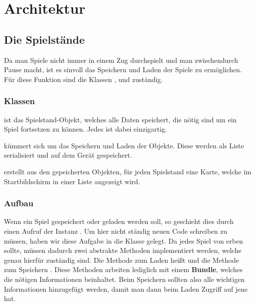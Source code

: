 \chapter{Architektur}

\section{Die Spielstände}
\sectionauthor{\leonard}

Da man Spiele nicht immer in einem Zug durchspielt und man zwischendurch Pause
macht, ist es sinvoll das Speichern und Laden der Spiele zu ermöglichen. Für
diese Funktion sind die Klassen ,  und
 zuständig.

\subsection{Klassen}

 ist das Spielstand-Objekt, welches alle Daten speichert, die
nötig sind um ein Spiel fortsetzen zu können. Jedes  ist dabei
einzigartig.

 kümmert sich um das Speichern und Laden der
 Objekte. Diese werden als Liste serialisiert und auf dem Gerät
gespeichert.

 erstellt aus den gepeicherten  Objekten,
für jeden Spielstand eine Karte, welche im Startbildschirm in einer Liste
angezeigt wird.

\subsection{Aufbau}

Wenn ein Spiel gespeichert oder geladen werden soll, so geschieht dies durch
einen Aufruf der Instanz . Um hier nicht ständig neuen
Code schreiben zu müssen, haben wir diese Aufgabe in die Klasse
 gelegt. Da jedes Spiel von  erben sollte,
müssen dadurch zwei abstrakte Methoden implementiert werden, welche genau
hierfür zuständig sind. Die Methode zum Laden heißt  und die
Methode zum Speichern . Diese Methoden arbeiten lediglich mit
einem \textbf{Bundle}, welches die nötigen Informationen beinhaltet. Beim
Speichern sollten also alle wichtigen Informationen hinzugefügt werden, damit
man dann beim Laden Zugriff auf jene hat.

